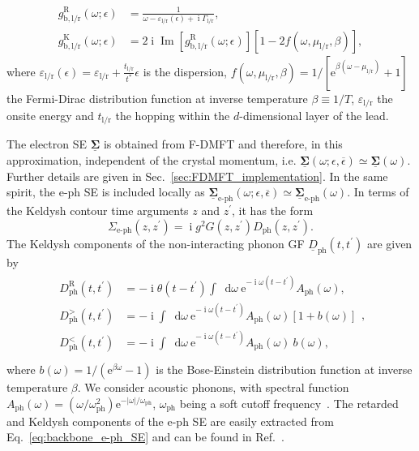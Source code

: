 \documentclass[aps,prb,groupedaddress,showpacs,twocolumn,superscriptaddress,10pt]{revtex4-2}
\newcommand{\ee}{\mathrm{e}}  %
\DeclareMathOperator*{\ii}{i} %
\newcommand*\dd{\mathop{}\!\mathrm{d}}
\newcommand{\mat}[1]{\bm{#1}} %
\newcommand{\kel}[1]{\underline{#1}} %
\DeclareMathOperator*{\iim}{Im}
\begin{document}
%  
\begin{align}
g^{\text{R}}_{\text{b},\text{l}/\text{r}}(\omega;\epsilon) &= \frac{1}{\omega-\varepsilon_{\text{l}/\text{r}}(\epsilon)+\ii\Gamma_{\text{l}/\text{r}}},\label{eq:retarded_bath_GF} \\
g^{\text{K}}_{\text{b},\text{l}/\text{r}}(\omega;\epsilon) &= 2\ii \iim[g_{\text{b},\text{l}/\text{r}}^{\text{R}}(\omega;\epsilon)][1-2f(\omega,\mu_{\text{l}/\text{r}},\beta)], \label{eq:keldysh_bath_GF}
\end{align} 
%
where $\varepsilon_{\text{l}/\text{r}}(\epsilon)=\varepsilon_{\text{l}/\text{r}} +\frac{t_{\text{l}/\text{r}}}{t^\ast}\epsilon$ is the dispersion, $f(\omega,\mu_{\text{l}/\text{r}},\beta)=1/[\ee^{\beta(\omega-\mu_{\text{l}/\text{r}})}+1]$ the Fermi-Dirac distribution function at inverse temperature $\beta \equiv 1/T$, $\varepsilon_{\text{l}/\text{r}}$ the onsite energy and $t_{\text{l}/\text{r}}$ the hopping within the $d$-dimensional layer of the lead.  
  
The electron SE $\kel{\mat{\Sigma}}$ is obtained from F-DMFT and therefore, in this approximation, independent of the crystal momentum, i.e. $\kel{\mat{\Sigma}}(\omega;\epsilon,\overline{\epsilon}) \simeq \kel{\mat{\Sigma}}(\omega)$. Further details are given in Sec.~\ref{sec:FDMFT_implementation}. In the same spirit, the e-ph SE is included locally as $\kel{\mat{\Sigma}}_{\text{e-ph}}(\omega;\epsilon,\overline{\epsilon}) \simeq \kel{\mat{\Sigma}}_{\text{e-ph}}(\omega)$. In terms of the Keldysh contour time arguments $z$ and $z^\prime$, it has the form      
% 
\begin{equation}\label{eq:backbone_e-ph_SE}
\Sigma_{\text{e-ph}}(z,z^{\prime}) = \ii g^{2} G(z,z^{\prime}) D_{\text{ph}}(z,z^{\prime}).
\end{equation}
% 
The Keldysh components of the non-interacting phonon GF $\kel{D}_{\text{ph}}(t,t^{\prime})$ are given by~\cite{ao.ts.14}
%
\begin{align}\label{eq:Ph_Prop_time}
\begin{split} 
D^{\text{R}}_{\text{ph}}(t,t^{\prime}) & = -\ii \theta(t-t^{\prime}) \int \dd\omega \ \ee^{-\ii\omega\left(t-t^{\prime}\right)} A_{\text{ph}}(\omega), \\
D^{>}_{\text{ph}}(t,t^{\prime}) & = -\ii \int \dd\omega \ \ee^{-\ii\omega\left(t-t^{\prime}\right)} A_{\text{ph}}(\omega) \left[ 1 + b(\omega) \right] \\
D^{<}_{\text{ph}}(t,t^{\prime}) & = -\ii \int \dd\omega \ \ee^{-\ii\omega\left(t-t^{\prime}\right)} A_{\text{ph}}(\omega) \ b(\omega), \\
\end{split}, 
\end{align}
%
where $b(\omega)=1/(\ee^{\beta\omega}-1)$ is the Bose-Einstein distribution function at inverse temperature $\beta$. We consider acoustic phonons, with spectral function $A_{\text{ph}}(\omega) = (\omega/\omega^{2}_{\text{ph}}) \ee^{-| \omega|/\omega_{\text{ph}}}$,  $\omega_{\text{ph}}$ being a soft cutoff frequency~\cite{pi.li.21}. The retarded and Keldysh components of the e-ph SE are easily extracted from  Eq.~\eqref{eq:backbone_e-ph_SE} and can be found in Ref.~\cite{ma.ga.22}. 
     
\end{document}
